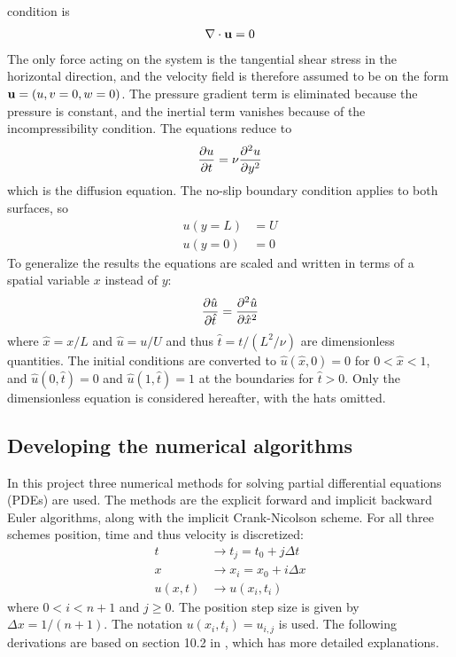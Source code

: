 \documentclass[aps,reprint]{revtex4-1}
\begin{document}
condition is
\begin{align*}
  \nabla \cdot \vb{u} = 0
\end{align*}
The only force acting on the system is the tangential shear stress in the
horizontal direction, and the velocity field is therefore assumed to be on the
form $\vb{u} = (u,v = 0,w = 0)$. The pressure gradient term is eliminated because the
pressure is constant, and the inertial term vanishes because of the incompressibility
condition. The equations reduce to
\begin{align}
  \pdv{u}{t} = \nu \pdv[2]{u}{y}
\end{align}
which is the diffusion equation. The no-slip boundary condition applies to both
surfaces, so
\begin{align*}
  u(y = L) &= U \\
  u(y = 0) &= 0
\end{align*}
To generalize the results the equations are scaled and written in terms of
a spatial variable $x$ instead of $y$:
\begin{align}
  \pdv{\hat{u}}{\hat{t}} = \pdv[2]{\hat{u}}{\hat{x}}
\end{align}
where $\hat{x} = x / L$ and $\hat{u} = u / U$ and thus $\hat{t} = t / (L^2 / \nu)$ are dimensionless quantities.
The initial conditions are converted to $\hat{u}(\hat{x},0) = 0$ for $0 < \hat{x} < 1$,
and $\hat{u}(0,\hat{t}) = 0$ and $\hat{u}(1,\hat{t}) = 1$ at the boundaries for $\hat{t} > 0$.
Only the dimensionless equation is considered hereafter, with the hats omitted.
\subsection{Developing the numerical algorithms}
In this project three numerical methods for solving partial differential equations (PDEs)
are used. The methods are the explicit forward and implicit backward Euler
algorithms, along with the implicit Crank-Nicolson scheme. For all three schemes
position, time and thus velocity is discretized:
\begin{align*}
  t &\rightarrow t_j = t_0 + j \Delta{t} \\
  x &\rightarrow x_i = x_0 + i \Delta{x} \\
  u(x,t) &\rightarrow u(x_i, t_i)
\end{align*}
where $0 < i < n + 1$ and $j \geq 0$. The position step size is given by $\Delta{x} = 1 /(n+1)$.
The notation $u(x_i,t_i) = u_{i,j}$ is used. The following derivations are based on
section 10.2 in \cite{mortenjensen}, which has more detailed explanations.
\end{document}
